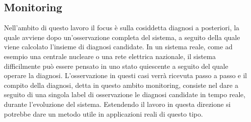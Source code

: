\subsection{Monitoring}
Nell'ambito di questo lavoro il focus è sulla cosiddetta diagnosi a posteriori, la quale avviene dopo un'osservazione completa del sistema, a seguito della quale viene calcolato l'insieme di diagnosi candidate. In un sistema reale, come ad esempio una centrale nucleare o una rete elettrica nazionale, il sistema difficilmente può essere pensato in uno stato quiescente a seguito del quale operare la diagnosi. L'osservazione in questi casi verrà ricevuta passo a passo e il compito della diagnosi, detta in questo ambito monitoring, consiste nel dare a seguito di una singola label di osservazione le diagnosi candidate in tempo reale, durante l'evoluzione del sistema. Estendendo il lavoro in questa direzione si potrebbe dare un metodo utile in applicazioni reali di questo tipo.